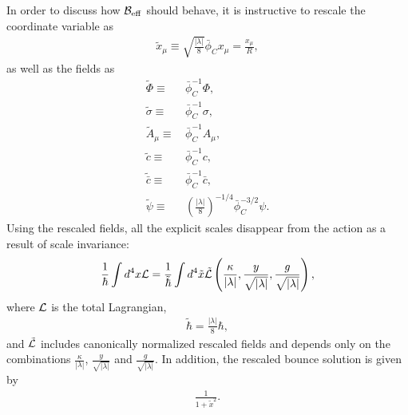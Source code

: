 \documentclass[12pt]{article}
\begin{document}
In order to discuss how $\mathcal{B}_{\rm eff}$ should behave, it is instructive
to rescale the coordinate variable as
\begin{align}
  \tilde x_\mu \equiv \sqrt{\frac{|\lambda|}{8}}\bar\phi_C x_\mu
  = \frac{x_\mu}{R},
\end{align}
as well as the fields as
\begin{align}
  \tilde \Phi \equiv &\, \bar{\phi}_C^{-1} \Phi,
  \\
  \tilde \sigma \equiv &\, \bar{\phi}_C^{-1} \sigma,
  \\
  \tilde A_\mu \equiv &\, \bar{\phi}_C^{-1} A_\mu,
  \\
  \tilde{c} \equiv &\, \bar{\phi}_C^{-1} c,
  \\
  \tilde{\bar{c}} \equiv &\, \bar{\phi}_C^{-1} \bar{c},
  \\
  \tilde \psi \equiv &\,
  \left(\frac{|\lambda|}{8}\right)^{-1/4} \bar\phi_C^{-3/2}
  \psi.
\end{align}
Using the rescaled fields, all the explicit scales disappear from the
action as a result of scale invariance:
\begin{align}
 \frac{1}{\hbar}
 \int d^4 x {\cal L} = 
 \frac{1}{\tilde{\hbar}}
 \int d^4 \tilde{x} 
 \tilde{\cal L}  \left(
   \frac{\kappa}{|\lambda|}, 
   \frac{y}{\sqrt{|\lambda|}},
   \frac{g}{\sqrt{|\lambda|}}
 \right),
\end{align}
where ${\cal L}$ is the total Lagrangian,
\begin{align}
 \tilde{\hbar} = \frac{|\lambda|}{8}\hbar,
\end{align}
and $\tilde{\cal L}$ includes canonically normalized rescaled fields
and depends only on the combinations $\frac{\kappa}{|\lambda|}$,
$\frac{y}{\sqrt{|\lambda|}}$ and $\frac{g}{\sqrt{|\lambda|}}$.  In
addition, the rescaled bounce solution is given by
\begin{align}
 \frac{1}{1+\tilde x^2}.
 \label{eq_rescaledBounce}
\end{align}
\end{document}
